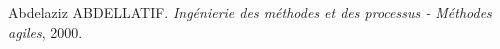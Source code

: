 \renewcommand{\bibname}{Bibliographie}
\begin{thebibliography}{ABC}
    Abdelaziz ABDELLATIF. \emph{Ingénierie des méthodes et des processus - Méthodes agiles}, 2000.
\end{thebibliography}
